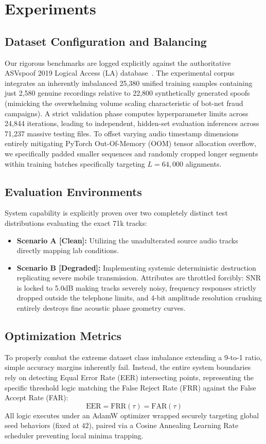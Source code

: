 \documentclass[10pt, twocolumn]{article}
\begin{document}
\section{Experiments}

\subsection{Dataset Configuration and Balancing}
Our rigorous benchmarks are logged explicitly against the authoritative ASVspoof 2019 Logical Access (LA) database~\cite{asvspoof2019}. The experimental corpus integrates an inherently imbalanced 25,380 unified training samples containing just 2,580 genuine recordings relative to 22,800 synthetically generated spoofs (mimicking the overwhelming volume scaling characteristic of bot-net fraud campaigns). A strict validation phase computes hyperparameter limits across 24,844 iterations, leading to independent, hidden-set evaluation inferences across 71,237 massive testing files. To offset varying audio timestamp dimensions entirely mitigating PyTorch Out-Of-Memory (OOM) tensor allocation overflow, we specifically padded smaller sequences and randomly cropped longer segments within training batches specifically targeting $L = 64,000$ alignments.

\subsection{Evaluation Environments}
System capability is explicitly proven over two completely distinct test distributions evaluating the exact 71k tracks:
\begin{itemize}
    \item \textbf{Scenario A [Clean]:} Utilizing the unadulterated source audio tracks directly mapping lab conditions.
    \item \textbf{Scenario B [Degraded]:} Implementing systemic deterministic destruction replicating severe mobile transmission. Attributes are throttled forcibly: SNR is locked to 5.0dB making tracks severely noisy, frequency responses strictly dropped outside the telephone limits, and 4-bit amplitude resolution crushing entirely destroys fine acoustic phase geometry curves. 
\end{itemize}

\subsection{Optimization Metrics}
To properly combat the extreme dataset class imbalance extending a 9-to-1 ratio, simple accuracy margins inherently fail. Instead, the entire system boundaries rely on detecting Equal Error Rate (EER) intersecting points, representing the specific threshold logic matching the False Reject Rate (FRR) against the False Accept Rate (FAR):
$$ \text{EER} = \text{FRR}(\tau) = \text{FAR}(\tau) $$
All logic executes under an AdamW optimizer wrapped securely targeting global seed behaviors (fixed at $42$), paired via a Cosine Annealing Learning Rate scheduler preventing local minima trapping.
\end{document}
